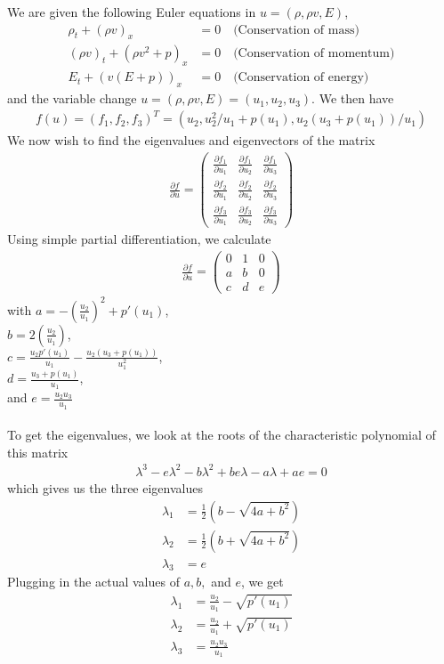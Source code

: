 We are given the following Euler equations in $u=(\rho, \rho v, E)$, 
\begin{align*}
	\rho_t + (\rho v)_x &= 0 \quad  \text{(Conservation of mass)} \\
	(\rho v)_t +(\rho v^2 + p)_x &= 0 \quad \text{(Conservation of momentum)} \\
	E_t + (v(E+p))_x &= 0 \quad \text{(Conservation of energy)}
\end{align*}
and the variable change $u = (\rho, \rho v, E) = (u_1, u_2, u_3)$. We then have 
\begin{align*}
	f(u) = (f_1, f_2, f_3)^T = (u_2, u_2^2/u_1 + p(u_1), u_2(u_3+p(u_1))/u_1)
\end{align*}
We now wish to find the eigenvalues and eigenvectors of the matrix 
\begin{align*}
	\frac{\partial f}{\partial u} = \begin{pmatrix}
	\frac{\partial f_1}{\partial u_1} & \frac{\partial f_1}{\partial u_2} & \frac{\partial f_1}{\partial u_3} \\
	\frac{\partial f_2}{\partial u_1} & \frac{\partial f_2}{\partial u_2} & \frac{\partial f_2}{\partial u_3} \\
	\frac{\partial f_3}{\partial u_1} & \frac{\partial f_3}{\partial u_2} & \frac{\partial f_3}{\partial u_3}
	\end{pmatrix}
\end{align*} 
Using simple partial differentiation, we calculate 
\begin{align*}
	\frac{\partial f}{\partial u} = \begin{pmatrix}
	0 & 1 & 0 \\ 
	a & b & 0 \\ 
	c & d & e
	\end{pmatrix}
\end{align*}
with $a=-(\frac{u_2}{u_1})^2 + p'(u_1)$, \\
 $b=2(\frac{u_2}{u_1})$, \\
 $c=\frac{u_2 p'(u_1)}{u_1} - \frac{u_2(u_3 + p(u_1))}{u_1^2}$, \\
 $d = \frac{u_3 + p(u_1)}{u_1}$, \\
 and $e=\frac{u_2u_3}{u_1}$
\\ \\
To get the eigenvalues, we look at the roots of the characteristic polynomial of this matrix 
\begin{align*}
	\lambda^3 -e \lambda^2 - b \lambda^2 + b e \lambda -a \lambda + a e = 0
\end{align*}
which gives us the three eigenvalues 
\begin{align*}
	\lambda_1 &= \frac{1}{2} (b - \sqrt{4a+b^2}) \\
	\lambda_2 &= \frac{1}{2} (b + \sqrt{4a+b^2}) \\
	\lambda_3 &= e
\end{align*}
Plugging in the actual values of $a,b,$ and $e$, we get 
\begin{align*}
	\lambda_1 &= \frac{u_2}{u_1} - \sqrt{p'(u_1)} \\
	\lambda_2 &= \frac{u_2}{u_1} + \sqrt{p'(u_1)} \\
	\lambda_3 &= \frac{u_2u_3}{u_1}
\end{align*}